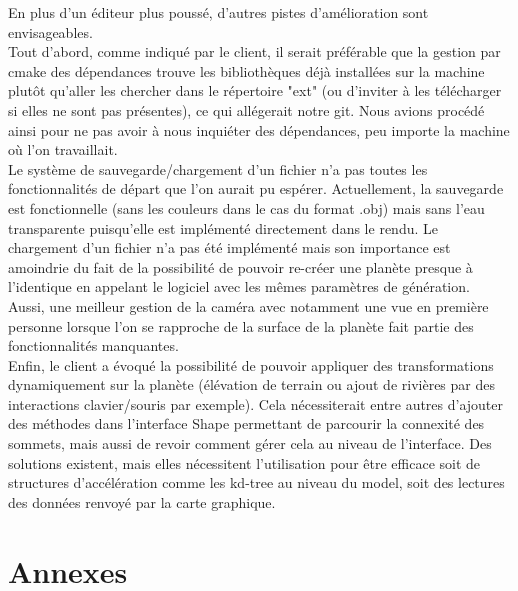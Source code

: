 \documentclass[a4paper]{article}
\begin{document}
En plus d'un éditeur plus poussé, d'autres pistes d'amélioration sont envisageables.\\

Tout d'abord, comme indiqué par le client, il serait préférable que la gestion par cmake des dépendances trouve les bibliothèques déjà installées sur la machine plutôt qu'aller les chercher dans le répertoire "ext" (ou d'inviter à les télécharger si elles ne sont pas présentes), ce qui allégerait notre git. Nous avions procédé ainsi pour ne pas avoir à nous inquiéter des dépendances, peu importe la machine où l'on travaillait.\\

Le système de sauvegarde/chargement d'un fichier n'a pas toutes les fonctionnalités de départ que l'on aurait pu espérer. Actuellement, la sauvegarde est fonctionnelle (sans les couleurs dans le cas du format .obj) mais sans l'eau transparente puisqu'elle est implémenté directement dans le rendu. Le chargement d'un fichier n'a pas été implémenté mais son importance est amoindrie du fait de la possibilité de pouvoir re-créer une planète presque à l'identique en appelant le logiciel avec les mêmes paramètres de génération.\\

Aussi, une meilleur gestion de la caméra avec notamment une vue en première personne lorsque l'on se rapproche de la surface de la planète fait partie des fonctionnalités manquantes.\\

Enfin, le client a évoqué la possibilité de pouvoir appliquer des transformations dynamiquement sur la planète (élévation de terrain ou ajout de rivières par des interactions clavier/souris par exemple). Cela nécessiterait entre autres d'ajouter des méthodes dans l'interface Shape permettant de parcourir la connexité des sommets, mais aussi de revoir comment gérer cela au niveau de l'interface. Des solutions existent, mais elles nécessitent l'utilisation pour être efficace soit de structures d'accélération comme les kd-tree au niveau du model, soit des lectures des données renvoyé par la carte graphique.\\

\newpage
\section{Annexes}
\end{document}
